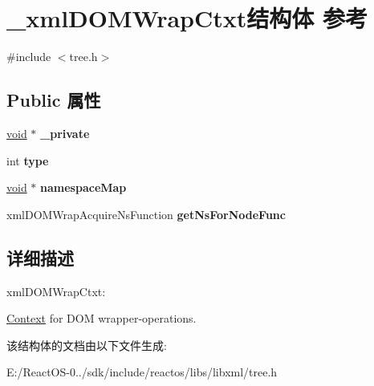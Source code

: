 \hypertarget{struct__xml_d_o_m_wrap_ctxt}{}\section{\+\_\+xml\+D\+O\+M\+Wrap\+Ctxt结构体 参考}
\label{struct__xml_d_o_m_wrap_ctxt}


{\ttfamily \#include $<$tree.\+h$>$}

\subsection*{Public 属性}
\begin{DoxyCompactItemize}
\item 
\mbox{\label{struct__xml_d_o_m_wrap_ctxt_ad3411d16697c0b7773be3e0719c75381}} 
\hyperlink{interfacevoid}{void} $\ast$ {\bfseries \+\_\+private}
\item 
\mbox{\label{struct__xml_d_o_m_wrap_ctxt_a1d84b623242d09de1c0ea065e5411fbc}} 
int {\bfseries type}
\item 
\mbox{\label{struct__xml_d_o_m_wrap_ctxt_ab39bb319265ac6962e847a0874cdbabd}} 
\hyperlink{interfacevoid}{void} $\ast$ {\bfseries namespace\+Map}
\item 
\mbox{\label{struct__xml_d_o_m_wrap_ctxt_a2fc065d32c83c5d1cdbd49f8162c7340}} 
xml\+D\+O\+M\+Wrap\+Acquire\+Ns\+Function {\bfseries get\+Ns\+For\+Node\+Func}
\end{DoxyCompactItemize}


\subsection{详细描述}
xml\+D\+O\+M\+Wrap\+Ctxt\+:

\hyperlink{struct_context}{Context} for D\+OM wrapper-\/operations. 

该结构体的文档由以下文件生成\+:\begin{DoxyCompactItemize}
\item 
E\+:/\+React\+O\+S-\/0../sdk/include/reactos/libs/libxml/tree.\+h\end{DoxyCompactItemize}
